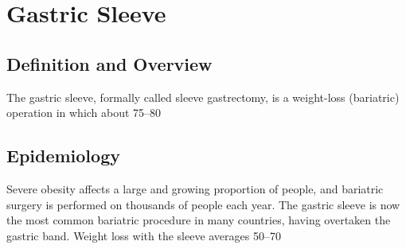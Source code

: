 \chapter{Gastric Sleeve}

\section*{Definition and Overview}
The gastric sleeve, formally called sleeve gastrectomy, is a weight-loss (bariatric) operation in which about 75--80%

\section*{Epidemiology}
Severe obesity affects a large and growing proportion of people, and bariatric surgery is performed on thousands of people each year. The gastric sleeve is now the most common bariatric procedure in many countries, having overtaken the gastric band. Weight loss with the sleeve averages 50--70%

